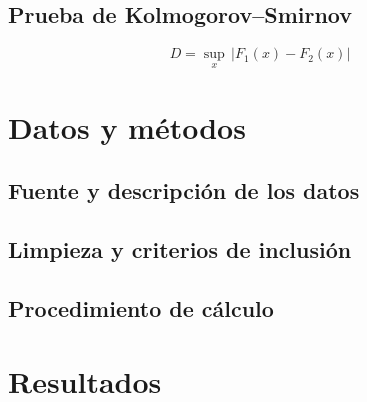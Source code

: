 \documentclass[11pt,a4paper]{article}
\begin{document}
\subsection{Prueba de Kolmogorov--Smirnov}
\begin{equation}
    D = \sup_{x} \, \lvert F_{1}(x) - F_{2}(x) \rvert
    \label{eq:ks}
\end{equation}

\section{Datos y métodos}

\subsection{Fuente y descripción de los datos}

\subsection{Limpieza y criterios de inclusión}

\subsection{Procedimiento de cálculo}

\section{Resultados}
\end{document}
